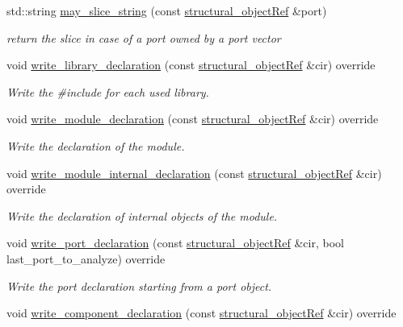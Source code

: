 \begin{DoxyCompactItemize}
std\+::string \hyperlink{classverilog__writer_a0dc813bd5493e6c2fd53c99d720eb958}{may\+\_\+slice\+\_\+string} (const \hyperlink{structural__objects_8hpp_a8ea5f8cc50ab8f4c31e2751074ff60b2}{structural\+\_\+object\+Ref} \&port)
\begin{DoxyCompactList}\small\item\em return the slice in case of a port owned by a port vector \end{DoxyCompactList}\item 
void \hyperlink{classverilog__writer_a271c63e96fc1d6907503b0a0698ef6f8}{write\+\_\+library\+\_\+declaration} (const \hyperlink{structural__objects_8hpp_a8ea5f8cc50ab8f4c31e2751074ff60b2}{structural\+\_\+object\+Ref} \&cir) override
\begin{DoxyCompactList}\small\item\em Write the \#include for each used library. \end{DoxyCompactList}\item 
void \hyperlink{classverilog__writer_a1acf62504aefe5c48d6257cf707b59c3}{write\+\_\+module\+\_\+declaration} (const \hyperlink{structural__objects_8hpp_a8ea5f8cc50ab8f4c31e2751074ff60b2}{structural\+\_\+object\+Ref} \&cir) override
\begin{DoxyCompactList}\small\item\em Write the declaration of the module. \end{DoxyCompactList}\item 
void \hyperlink{classverilog__writer_a7384e2a4f2485bcadb61747e2371f64e}{write\+\_\+module\+\_\+internal\+\_\+declaration} (const \hyperlink{structural__objects_8hpp_a8ea5f8cc50ab8f4c31e2751074ff60b2}{structural\+\_\+object\+Ref} \&cir) override
\begin{DoxyCompactList}\small\item\em Write the declaration of internal objects of the module. \end{DoxyCompactList}\item 
void \hyperlink{classverilog__writer_a1b1655ecdaf1a37e7b9cf5dca23b8219}{write\+\_\+port\+\_\+declaration} (const \hyperlink{structural__objects_8hpp_a8ea5f8cc50ab8f4c31e2751074ff60b2}{structural\+\_\+object\+Ref} \&cir, bool last\+\_\+port\+\_\+to\+\_\+analyze) override
\begin{DoxyCompactList}\small\item\em Write the port declaration starting from a port object. \end{DoxyCompactList}\item 
void \hyperlink{classverilog__writer_a0e4f86c1473978b5c7284b763db4e55a}{write\+\_\+component\+\_\+declaration} (const \hyperlink{structural__objects_8hpp_a8ea5f8cc50ab8f4c31e2751074ff60b2}{structural\+\_\+object\+Ref} \&cir) override

\end{DoxyCompactItemize}
